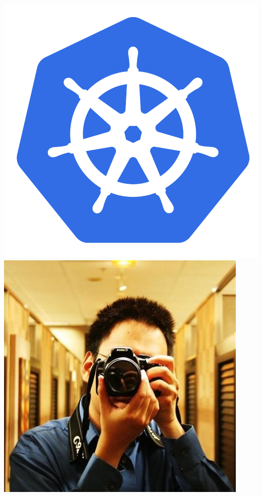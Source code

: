 \begin{frame}
\begin{columns}[c]
\begin{column}{.35\textwidth}
\includegraphics[width=.5\textwidth]{kubernetes.png}\\
\includegraphics[width=.5\textwidth]{ray.jpg}
\end{column}
\end{columns}
\end{frame}


